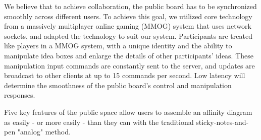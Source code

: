 \documentclass{sigchi}
\begin{document}
\begin{itemize}
We believe that to achieve collaboration, the public board has to be synchronized smoothly across different users. To achieve this goal, we utilized core technology from a massively multiplayer online gaming (MMOG) system that uses network sockets, and adapted the technology to suit our system. Participants are treated like players in a MMOG system, with a unique identity and the ability to manipulate idea boxes and enlarge the details of other participants' ideas. These manipulation input commands are constantly sent to the server, and updates are broadcast to other clients at up to 15 commands per second.  Low latency will determine the smoothness of the public board's control and manipulation responses. 


Five key features of the public space allow users to assemble an affinity diagram as easily - or more easily - than they can with the traditional sticky-notes-and-pen "analog" method.

\begin{itemize}



\end{itemize}
\end{itemize}
\end{document}
